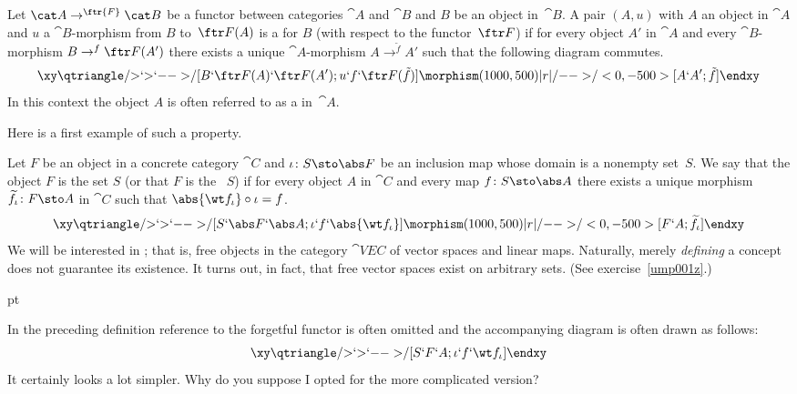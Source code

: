 \begin{defn}\label{00078} Let $\cat A \to^{\ftr{F}} \cat B$ be a functor between categories
$\cat A$ and $\cat B$ and $B$ be an object in~$\cat B$.  A pair $(A,u)$ with $A$ an
object in $\cat A$ and $u$ a $\cat B$-morphism from $B$ to~$\ftr F(A)$ is a
 for $B$ (with respect to the functor~$\ftr F$) if for every
object $A'$ in $\cat A$ and every $\cat B$-morphism $B \to^f \ftr F(A')$ there exists a
unique $\cat A$-morphism $A \to^{\tilde f} A'$ such that the following diagram commutes.
 \begin{equation}\label{00078i}
   \xy
     \qtriangle/{>}`{>}`{-->}/[B`\ftr F(A)`\ftr F(A');u`f`\ftr F(\tilde f)]
     \morphism(1000,500)|r|/{-->}/<0,-500>[A`A';\tilde f]
   \endxy
 \end{equation}
In this context the object $A$ is often referred to as a
 in~$\cat A$.
\end{defn}

Here is a first example of such a property.

\begin{defn} Let $F$ be an object in a concrete category $\cat C$ and
$\iota\colon S \sto \abs F$ be an inclusion map whose domain is a nonempty set~$S$.  We say that the
object $F$ is
 the set $S$ (or that $F$ is the ~$S$) if for
every object $A$ in $\cat C$ and every map $f\colon S \sto \abs A$ there exists a unique
morphism $\widetilde f_\iota\colon F \sto A$ in $\cat C$ such that $\abs{\wt f_\iota}
\circ \iota = f$.
 \[\xy
     \qtriangle/{>}`{>}`{-->}/[S`\abs F`\abs A;\iota`f`\abs{\wt f_\iota}]
     \morphism(1000,500)|r|/{-->}/<0,-500>[F`A;\widetilde f_\iota]
   \endxy\]
We will be interested in
; that is, free objects in the category $\cat{VEC}$ of vector
spaces and linear maps.  Naturally, merely \emph{defining} a concept does not guarantee
its existence. It turns out, in fact, that free vector spaces exist on arbitrary sets.
(See exercise~\ref{ump001z}.)
\end{defn}

 pt

\begin{exer} In the preceding definition reference to the forgetful functor is often
omitted and the accompanying diagram is often drawn as follows:
 \[\xy
     \qtriangle/{>}`{>}`{-->}/[S`F`A;\iota`f`\wt f_\iota]
   \endxy\]
It certainly looks a lot simpler.  Why do you suppose I opted for the more complicated
version?
\end{exer}

